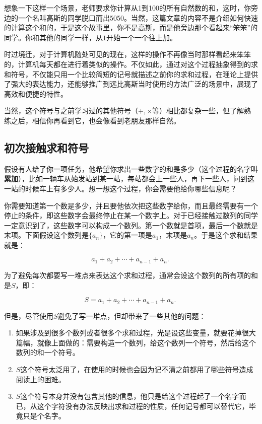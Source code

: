 
\begin{issues}
\issueDraft
\end{issues}


想象一下这样一个场景，老师要求你计算从1到100的所有自然数的和，这时，你旁边的一个名叫高斯的同学脱口而出5050。当然，这篇文章的内容不是介绍如何快速的计算这个和的，于是这个故事里，你不是高斯，而是他旁边那个看起来“笨笨”的同学。你和其他的同学一样，从$1$开始一个一个往上加。

时过境迁，对于计算机随处可见的现在，这样的操作不再像当时那样看起来笨笨的，计算机每天都在进行着类似的操作。不仅如此，通过对这个过程抽象得到的求和符号，不仅能只用一个比较简短的记号就描述之前你的求和过程，在理论上提供了强大的表达能力，还能够推广到远比高斯当时使用的方法广泛的场景中，展现了高效和便捷的特性。

当然，这个符号与之前学习过的其他符号（$+,\times$等）相比都复杂一些，但了解熟练之后，相信你再看到它，也会像看到老朋友那样自然。


\subsection{初次接触求和符号}

假设有人给了你一项任务，他希望你求出一些数字的和是多少（这个过程的名字叫\textbf{累加}），比如一辆车从始发站到某一站，每站都会上一些人，再下一些人，问到这一站的时候车上有多少人。想一想这个过程，你会需要他给你哪些信息呢？

你需要知道第一个数是多少，并且要他依次把这些数字给你，而且最终需要有一个停止的条件，即这些数字会最终停止在某一个数字上。对于已经接触过数列的同学一定意识到了，这些数字可以构成一个数列。第一个数就是首项，最后一个数就是末项。下面假设这个数列是$\{a_n\}$，它的第一项是$a_1$，末项是$a_n$。于是这个求和结果就是：

\begin{equation}
a_1+a_2+\cdots+a_{n-1}+a_{n}.~
\end{equation}

为了避免每次都要写一堆点来表达这个求和过程，通常会设这个数列的所有项的和是$S$，即：

\begin{equation}
S=a_1+a_2+\cdots+a_{n-1}+a_{n}.~
\end{equation}

但是，尽管使用$S$避免了写一堆点，但却带来了一些其他的问题：
\begin{enumerate}
\item 如果涉及到很多个数列或者很多个求和过程，光是设这些变量，就要花掉很大篇幅，就像上面做的：需要构造一个数列，给这个数列一个符号，然后给这个数列的和一个符号。
\item $S$这个符号太泛用了，在使用的时候也会因为记不清之前都用了哪些符号造成阅读上的困难。
\item $S$这个符号本身并没有包含其他的信息，他只是给这个过程起了一个名字而已，从这个字符没有办法反映出求和过程的性质，任何记号都可以替代它，毕竟只是个名字。
\end{enumerate}

